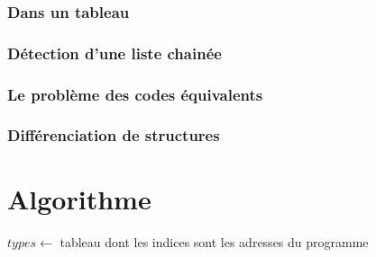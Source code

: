 \documentclass[a4paper,11pt]{article}
\begin{document}
\newpage

\subsubsection{Dans un tableau}
\begin{multicols}{2}


\columnbreak


\end{multicols}

\newpage

\subsubsection{Détection d'une liste chainée}
\begin{multicols}{2}


\columnbreak


\end{multicols}

\newpage

\subsubsection{Le problème des codes équivalents}
\begin{multicols}{2}


\columnbreak


\end{multicols}

\newpage

\subsubsection{Différenciation de structures}
\begin{multicols}{2}


\columnbreak


\end{multicols}

\newpage

\section{Algorithme}
\begin{algorithm}[H]

\BlankLine

$types \leftarrow $ tableau dont les indices sont les adresses du programme\;

\end{algorithm}
\end{document}
